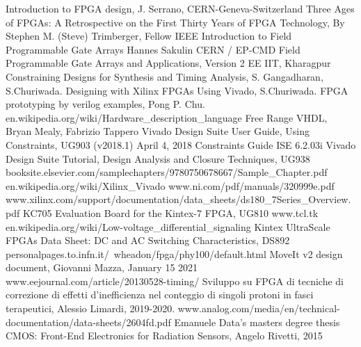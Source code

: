 \begin{thebibliography}{00}
	Introduction to FPGA design, J. Serrano, CERN-Geneva-Switzerland
	Three Ages of FPGAs: A Retrospective on the First Thirty Years of FPGA Technology, By Stephen M. (Steve) Trimberger, Fellow IEEE
	Introduction to Field Programmable Gate Arrays Hannes Sakulin CERN / EP-CMD
	Field Programmable Gate Arrays and Applications, Version 2 EE IIT, Kharagpur
	Constraining Designs for Synthesis and Timing Analysis, S. Gangadharan, S.Churiwada.
	Designing with Xilinx FPGAs Using Vivado, S.Churiwada.
	FPGA prototyping by verilog examples, Pong P. Chu.
	en.wikipedia.org/wiki/Hardware\_description\_language
	Free Range VHDL, Bryan Mealy, Fabrizio Tappero
	Vivado Design Suite User Guide, Using Constraints, UG903 (v2018.1) April 4, 2018
	Constraints Guide ISE 6.2.03i
	Vivado Design Suite Tutorial, Design Analysis and Closure Techniques, UG938
	booksite.elsevier.com/samplechapters/9780750678667/Sample\_Chapter.pdf
	en.wikipedia.org/wiki/Xilinx\_Vivado
	www.ni.com/pdf/manuals/320999e.pdf
	www.xilinx.com/support/documentation/data\_sheets/ds180\_7Series\_Overview.pdf
	KC705 Evaluation Board for the Kintex-7 FPGA, UG810	
	www.tcl.tk
	en.wikipedia.org/wiki/Low-voltage\_differential\_signaling
	Kintex UltraScale FPGAs Data Sheet: DC and AC Switching Characteristics, DS892
	personalpages.to.infn.it/~wheadon/fpga/phy100/default.html
	MoveIt v2 design document, Giovanni Mazza, January 15 2021
	www.eejournal.com/article/20130528-timing/
	Sviluppo su FPGA di tecniche di correzione di effetti d'inefficienza nel conteggio di singoli protoni in fasci terapeutici, Alessio Limardi, 2019-2020.
	www.analog.com/media/en/technical-documentation/data-sheets/2604fd.pdf
	Emanuele Data's masters degree thesis
	 CMOS: Front-End Electronics for Radiation Sensors, Angelo Rivetti, 2015
	
	
\end{thebibliography}
